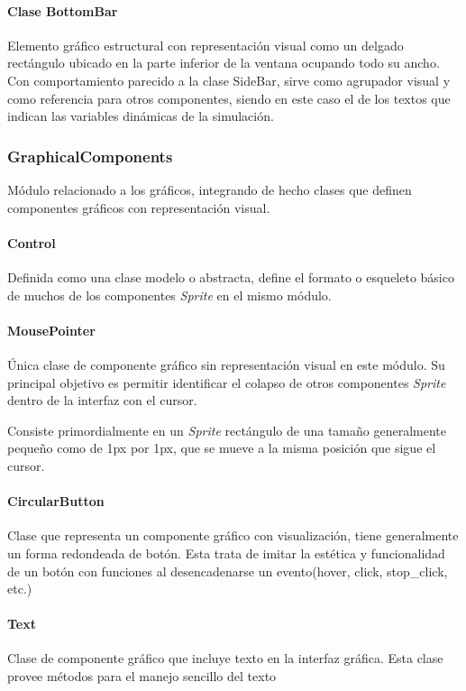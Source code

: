 \documentclass[]{article}
\begin{document}
			\paragraph{Clase BottomBar}
				Elemento gráfico estructural con representación visual como un delgado rectángulo ubicado en la parte inferior de la ventana ocupando todo su ancho. Con comportamiento parecido a la clase SideBar, sirve como agrupador visual y como referencia para otros componentes, siendo en este caso el de los textos que indican las variables dinámicas de la simulación.
			
			
			
			
		\subsubsection{GraphicalComponents}
			Módulo relacionado a los gráficos, integrando de hecho clases que definen componentes gráficos con representación visual.
			
			\paragraph{Control}
				Definida como una clase modelo o abstracta, define el formato o esqueleto básico de muchos de los componentes \textit{Sprite} en el mismo módulo.
				
			\paragraph{MousePointer}
				Única clase de componente gráfico sin representación visual en este módulo. Su principal objetivo es permitir identificar el colapso de otros componentes \textit{Sprite} dentro de la interfaz con el cursor.
				
				Consiste primordialmente en un \textit{Sprite} rectángulo de una tamaño generalmente pequeño como de 1px por 1px, que se mueve a la misma posición que sigue el cursor.
				
			\paragraph{CircularButton}
				Clase que representa un componente gráfico con visualización, tiene generalmente un forma redondeada de botón. Esta trata de imitar la estética y funcionalidad de un botón con funciones al desencadenarse un evento(hover, click, stop\_click, etc.)
				
			\paragraph{Text}
				Clase de componente gráfico que incluye texto en la interfaz gráfica. Esta clase provee métodos para el manejo sencillo del texto
				
\end{document}
